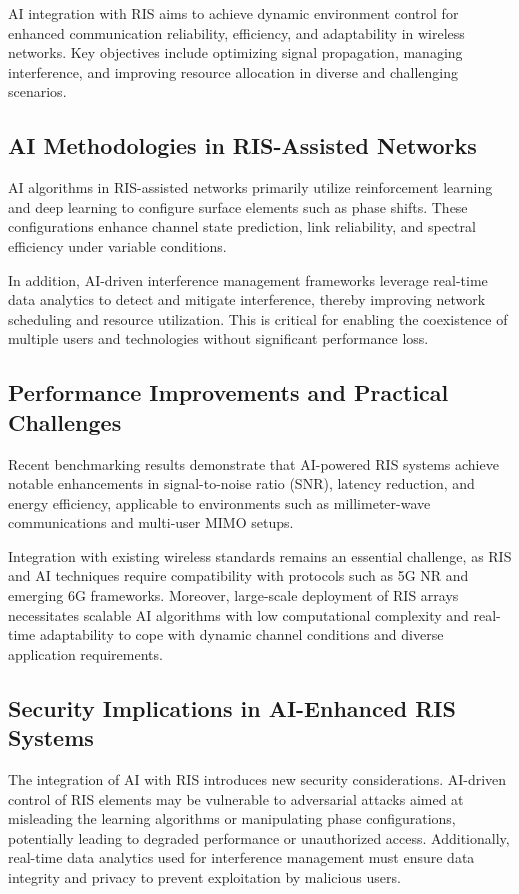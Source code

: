 \documentclass[sigconf]{acmart}
\begin{document}
AI integration with RIS aims to achieve dynamic environment control for enhanced communication reliability, efficiency, and adaptability in wireless networks. Key objectives include optimizing signal propagation, managing interference, and improving resource allocation in diverse and challenging scenarios.

\subsection{AI Methodologies in RIS-Assisted Networks}

AI algorithms in RIS-assisted networks primarily utilize reinforcement learning and deep learning to configure surface elements such as phase shifts. These configurations enhance channel state prediction, link reliability, and spectral efficiency under variable conditions.

In addition, AI-driven interference management frameworks leverage real-time data analytics to detect and mitigate interference, thereby improving network scheduling and resource utilization. This is critical for enabling the coexistence of multiple users and technologies without significant performance loss.

\subsection{Performance Improvements and Practical Challenges}

Recent benchmarking results demonstrate that AI-powered RIS systems achieve notable enhancements in signal-to-noise ratio (SNR), latency reduction, and energy efficiency, applicable to environments such as millimeter-wave communications and multi-user MIMO setups.

Integration with existing wireless standards remains an essential challenge, as RIS and AI techniques require compatibility with protocols such as 5G NR and emerging 6G frameworks. Moreover, large-scale deployment of RIS arrays necessitates scalable AI algorithms with low computational complexity and real-time adaptability to cope with dynamic channel conditions and diverse application requirements.

\subsection{Security Implications in AI-Enhanced RIS Systems}

The integration of AI with RIS introduces new security considerations. AI-driven control of RIS elements may be vulnerable to adversarial attacks aimed at misleading the learning algorithms or manipulating phase configurations, potentially leading to degraded performance or unauthorized access. Additionally, real-time data analytics used for interference management must ensure data integrity and privacy to prevent exploitation by malicious users.
\end{document}
